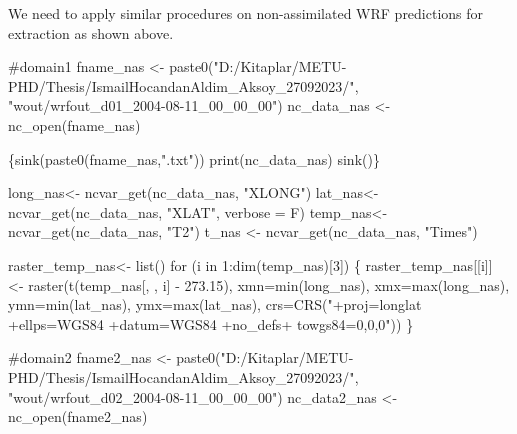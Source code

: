\documentclass[
  letterpaper,
  DIV=11,
  numbers=noendperiod,
  abstract]{scrartcl}
\newenvironment{Shaded}{\begin{snugshade}}{\end{snugshade}}
\newcommand{\AttributeTok}[1]{\textcolor[rgb]{0.40,0.45,0.13}{#1}}
\newcommand{\CommentTok}[1]{\textcolor[rgb]{0.37,0.37,0.37}{#1}}
\newcommand{\ControlFlowTok}[1]{\textcolor[rgb]{0.00,0.23,0.31}{#1}}
\newcommand{\DecValTok}[1]{\textcolor[rgb]{0.68,0.00,0.00}{#1}}
\newcommand{\FloatTok}[1]{\textcolor[rgb]{0.68,0.00,0.00}{#1}}
\newcommand{\FunctionTok}[1]{\textcolor[rgb]{0.28,0.35,0.67}{#1}}
\newcommand{\NormalTok}[1]{\textcolor[rgb]{0.00,0.23,0.31}{#1}}
\newcommand{\OtherTok}[1]{\textcolor[rgb]{0.00,0.23,0.31}{#1}}
\newcommand{\SpecialCharTok}[1]{\textcolor[rgb]{0.37,0.37,0.37}{#1}}
\newcommand{\StringTok}[1]{\textcolor[rgb]{0.13,0.47,0.30}{#1}}
\begin{document}
We need to apply similar procedures on non-assimilated WRF predictions
for extraction as shown above.

\begin{Shaded}
\begin{Highlighting}[]
\CommentTok{\#domain1}
\NormalTok{fname\_nas }\OtherTok{\textless{}{-}} \FunctionTok{paste0}\NormalTok{(}\StringTok{"D:/Kitaplar/METU{-}PHD/Thesis/IsmailHocandanAldim\_Aksoy\_27092023/"}\NormalTok{,}
\StringTok{"wout/wrfout\_d01\_2004{-}08{-}11\_00\_00\_00"}\NormalTok{)}
\NormalTok{nc\_data\_nas }\OtherTok{\textless{}{-}} \FunctionTok{nc\_open}\NormalTok{(fname\_nas)}

\NormalTok{\{}\FunctionTok{sink}\NormalTok{(}\FunctionTok{paste0}\NormalTok{(fname\_nas,}\StringTok{".txt"}\NormalTok{))}
  \FunctionTok{print}\NormalTok{(nc\_data\_nas)}
  \FunctionTok{sink}\NormalTok{()\}}

\NormalTok{long\_nas}\OtherTok{\textless{}{-}} \FunctionTok{ncvar\_get}\NormalTok{(nc\_data\_nas, }\StringTok{"XLONG"}\NormalTok{)}
\NormalTok{lat\_nas}\OtherTok{\textless{}{-}} \FunctionTok{ncvar\_get}\NormalTok{(nc\_data\_nas, }\StringTok{"XLAT"}\NormalTok{, }\AttributeTok{verbose =}\NormalTok{ F)}
\NormalTok{temp\_nas}\OtherTok{\textless{}{-}} \FunctionTok{ncvar\_get}\NormalTok{(nc\_data\_nas, }\StringTok{"T2"}\NormalTok{) }
\NormalTok{t\_nas }\OtherTok{\textless{}{-}} \FunctionTok{ncvar\_get}\NormalTok{(nc\_data\_nas, }\StringTok{"Times"}\NormalTok{)}

\NormalTok{raster\_temp\_nas}\OtherTok{\textless{}{-}} \FunctionTok{list}\NormalTok{()}
\ControlFlowTok{for}\NormalTok{ (i }\ControlFlowTok{in} \DecValTok{1}\SpecialCharTok{:}\FunctionTok{dim}\NormalTok{(temp\_nas)[}\DecValTok{3}\NormalTok{])   \{}
\NormalTok{    raster\_temp\_nas[[i]] }\OtherTok{\textless{}{-}} \FunctionTok{raster}\NormalTok{(}\FunctionTok{t}\NormalTok{(temp\_nas[, , i] }\SpecialCharTok{{-}} \FloatTok{273.15}\NormalTok{), }
       \AttributeTok{xmn=}\FunctionTok{min}\NormalTok{(long\_nas), }\AttributeTok{xmx=}\FunctionTok{max}\NormalTok{(long\_nas),}
       \AttributeTok{ymn=}\FunctionTok{min}\NormalTok{(lat\_nas), }\AttributeTok{ymx=}\FunctionTok{max}\NormalTok{(lat\_nas), }
       \AttributeTok{crs=}\FunctionTok{CRS}\NormalTok{(}\StringTok{"+proj=longlat +ellps=WGS84 +datum=WGS84 +no\_defs+ towgs84=0,0,0"}\NormalTok{))}
\NormalTok{\}}

\CommentTok{\#domain2}
\NormalTok{fname2\_nas }\OtherTok{\textless{}{-}} \FunctionTok{paste0}\NormalTok{(}\StringTok{"D:/Kitaplar/METU{-}PHD/Thesis/IsmailHocandanAldim\_Aksoy\_27092023/"}\NormalTok{,}
\StringTok{"wout/wrfout\_d02\_2004{-}08{-}11\_00\_00\_00"}\NormalTok{)}
\NormalTok{nc\_data2\_nas }\OtherTok{\textless{}{-}} \FunctionTok{nc\_open}\NormalTok{(fname2\_nas)}


\end{Highlighting}
\end{Shaded}
\end{document}
